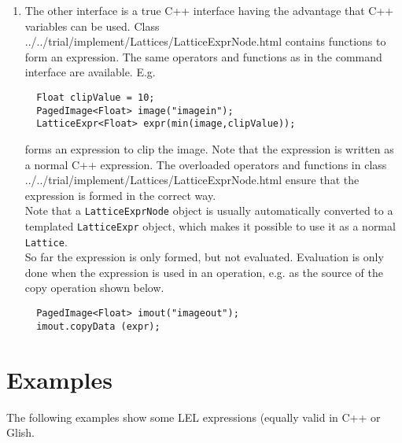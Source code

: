 \begin{itemize}
\begin{enumerate}
  \item
    The other interface is a true C++ interface having the
    advantage that C++ variables can be used. Class
    {../../trial/implement/Lattices/LatticeExprNode.html}
    contains functions to form an expression. The same operators
    and functions as in the command interface are available.
    E.g.
\begin{verbatim}
  Float clipValue = 10;
  PagedImage<Float> image("imagein");
  LatticeExpr<Float> expr(min(image,clipValue));
\end{verbatim}
    forms an expression to clip the image. Note that the expression is
    written as a normal C++ expression. The overloaded operators and
    functions in class 
    {../../trial/implement/Lattices/LatticeExprNode.html}
    ensure that the expression is formed in the correct way.
    \\ Note that a \texttt{LatticeExprNode} object is usually
    automatically converted to a templated \texttt{LatticeExpr} object,
    which makes it possible to use it as a normal \texttt{Lattice}.
    \\So far the expression is only formed, but not evaluated.
    Evaluation is only done when the expression is used in an
    operation, e.g. as the source of the copy operation shown below.
\begin{verbatim}
  PagedImage<Float> imout("imageout");
  imout.copyData (expr);
\end{verbatim}

  \end{enumerate}

\end{itemize}

\section{\label{LEL:EXAMPLES}{Examples}}
The following examples show some LEL expressions (equally valid 
in C++ or Glish.

